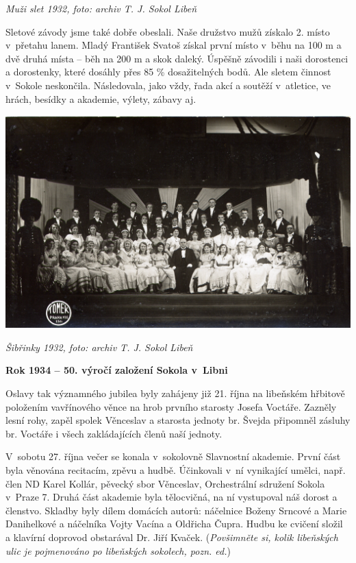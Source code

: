 \documentclass[a5paper, 11pt, twoside]{article}
\begin{document}
\textit{Muži slet 1932, foto: archiv T. J. Sokol Libeň}

Sletové závody jsme také dobře obeslali. Naše družstvo mužů získalo 2.
místo v~přetahu lanem. Mladý František Svatoš získal první místo v~běhu
na 100 m a dvě druhá místa -- běh na 200 m a skok daleký. Úspěšně
závodili i naši dorostenci a dorostenky, které dosáhly přes 85 \%
dosažitelných bodů. Ale sletem činnost v~Sokole neskončila. Následovala,
jako vždy, řada akcí a soutěží v~atletice, ve hrách, besídky a akademie,
výlety, zábavy aj.

 \includegraphics[width=\textwidth]{img/30_sibrinky.jpg}

\textit{Šibřinky 1932, foto: archiv T. J. Sokol Libeň}

\textbf{Rok 1934 -- 50. výročí založení Sokola v~Libni}

Oslavy tak významného jubilea byly zahájeny již 21. října na libeňském
hřbitově položením vavřínového věnce na hrob prvního starosty Josefa
Voctáře. Zazněly lesní rohy, zapěl spolek Věnceslav a starosta jednoty
br. Švejda připomněl zásluhy br. Voctáře i všech zakládajících členů
naší jednoty.

V~sobotu 27. října večer se konala v~sokolovně Slavnostní akademie.
První část byla věnována recitacím, zpěvu a hudbě. Účinkovali v~ní
vynikající umělci, např. člen ND Karel Kollár, pěvecký sbor Věnceslav,
Orchestrální sdružení Sokola v~Praze 7. Druhá část akademie byla
tělocvičná, na ní vystupoval náš dorost a členstvo. Skladby byly dílem
domácích autorů: náčelnice Boženy Srncové a Marie Danihelkové a
náčelníka Vojty Vacína a Oldřicha Čupra. Hudbu ke cvičení složil a
klavírní doprovod obstarával Dr. Jiří Kvaček. (\textit{Povšimněte si,
kolik libeňských ulic je pojmenováno po libeňských sokolech, pozn. ed.})
\end{document}

